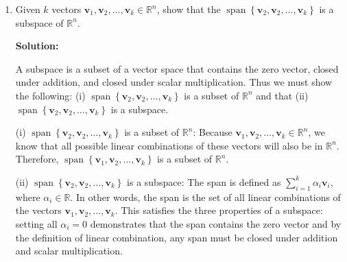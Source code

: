 \documentclass{homework}
\begin{document}
\maketitle

\question

\begin{enumerate}[label=(\alph*)]
	\item Given $k$ vectors $\mathbf{v}_1, \mathbf{v}_2, \ldots,
		      \mathbf{v}_{k} \in \mathbb{R}^n$, show that the
	      $\operatorname{span}\left\{\mathbf{v}_{2},
		      \mathbf{v}_{2}, \ldots, \mathbf{v}_{k}\right\}$ is a
	      subspace of $\mathbb{R}^n$.

	      \par \textbf{Solution:}
	      \par A subspace is a subset of a vector space that contains the zero
	      vector, closed under addition, and closed under scalar multiplication.
	      Thus we must show the following: (i) $\operatorname{span}\left\{\mathbf{v}_{2},
		      \mathbf{v}_{2}, \ldots, \mathbf{v}_{k}\right\}$ is a subset of
	      $\mathbb{R}^n$ and that (ii) $\operatorname{span}\left\{\mathbf{v}_{2},
		      \mathbf{v}_{2}, \ldots, \mathbf{v}_{k}\right\}$ is a subspace.

	      \par (i) $\operatorname{span}\left\{\mathbf{v}_{2},
		      \mathbf{v}_{2}, \ldots, \mathbf{v}_{k}\right\}$ is a subset of
	      $\mathbb{R}^n$: Because $\mathbf{v}_1, \mathbf{v}_2, \ldots,
		      \mathbf{v}_{k} \in \mathbb{R}^n$, we know that all possible linear
	      combinations of these vectors will also be in $\mathbb{R}^n$.
	      Therefore, $\operatorname{span}\left\{\mathbf{v}_{1},
		      \mathbf{v}_{2}, \ldots, \mathbf{v}_{k}\right\}$ is a subset of
	      $\mathbb{R}^n$.

	      \par (ii) $\operatorname{span}\left\{\mathbf{v}_{2},
		      \mathbf{v}_{2}, \ldots, \mathbf{v}_{k}\right\}$ is a subspace:
	      The span is defined as $\sum_{i=1}^{k} \alpha_i \mathbf{v}_i$,
	      where $\alpha_i \in \mathbb{R}$. In other words, the span is the set
	      of all linear combinations of the vectors $\mathbf{v}_1, \mathbf{v}_2,
		      \ldots, \mathbf{v}_{k}$. This satisfies the three properties of a
	      subspace: setting all $\alpha_i = 0$ demonstrates that the span
	      contains the zero vector and by the definition of linear combination,
	      any span must be closed under addition and scalar multiplication.


\end{enumerate}
\end{document}
